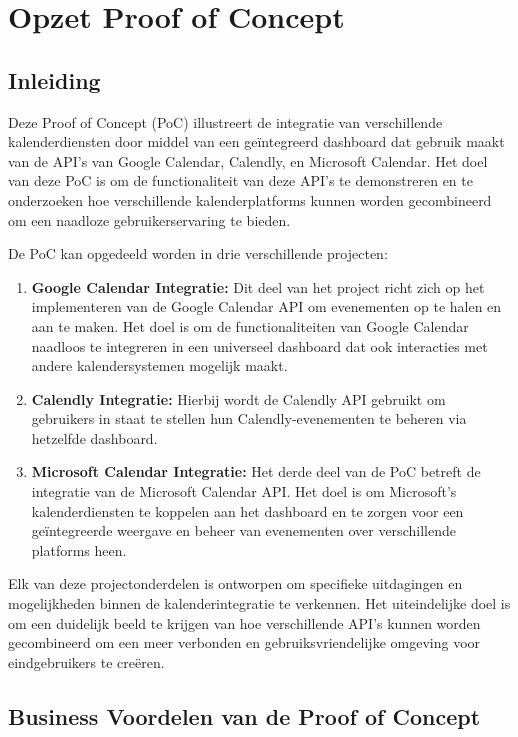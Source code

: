 \chapter{Opzet Proof of Concept}%
\label{ch:proof-of-concept}
\section{Inleiding}
Deze Proof of Concept (PoC) illustreert de integratie van verschillende kalenderdiensten door middel van een geïntegreerd dashboard dat gebruik maakt van de API's van Google Calendar, Calendly, en Microsoft Calendar. Het doel van deze PoC is om de functionaliteit van deze API's te demonstreren en te onderzoeken hoe verschillende kalenderplatforms kunnen worden gecombineerd om een naadloze gebruikerservaring te bieden.

De PoC kan opgedeeld worden in drie verschillende projecten:
\begin{enumerate}
    \item \textbf{Google Calendar Integratie:} Dit deel van het project richt zich op het implementeren van de Google Calendar API om evenementen op te halen en aan te maken. Het doel is om de functionaliteiten van Google Calendar naadloos te integreren in een universeel dashboard dat ook interacties met andere kalendersystemen mogelijk maakt.
    
    \item \textbf{Calendly Integratie:} Hierbij wordt de Calendly API gebruikt om gebruikers in staat te stellen hun Calendly-evenementen te beheren via hetzelfde dashboard.
    
    \item \textbf{Microsoft Calendar Integratie:} Het derde deel van de PoC betreft de integratie van de Microsoft Calendar API. Het doel is om Microsoft's kalenderdiensten te koppelen aan het dashboard en te zorgen voor een geïntegreerde weergave en beheer van evenementen over verschillende platforms heen.
\end{enumerate}

Elk van deze projectonderdelen is ontworpen om specifieke uitdagingen en mogelijkheden binnen de kalenderintegratie te verkennen. Het uiteindelijke doel is om een duidelijk beeld te krijgen van hoe verschillende API's kunnen worden gecombineerd om een meer verbonden en gebruiksvriendelijke omgeving voor eindgebruikers te creëren. 


\section{Business Voordelen van de Proof of Concept}

